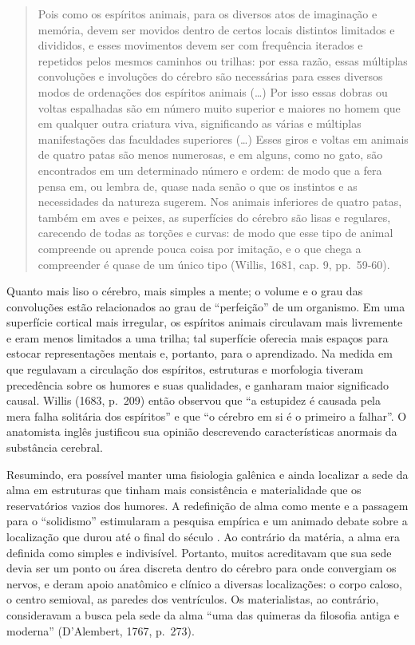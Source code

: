 \begin{quote}
Pois como os espíritos animais, para os diversos atos de imaginação e
memória, devem ser movidos dentro de certos locais distintos limitados e
divididos, e esses movimentos devem ser com frequência iterados e
repetidos pelos mesmos caminhos ou trilhas: por essa razão, essas
múltiplas convoluções e involuções do cérebro são necessárias para esses
diversos modos de ordenações dos espíritos animais (\ldots{}) Por isso essas
dobras ou voltas espalhadas são em número muito superior e maiores no
homem que em qualquer outra criatura viva, significando as várias e
múltiplas manifestações das faculdades superiores (\ldots{}) Esses giros e
voltas em animais de quatro patas são menos numerosas, e em alguns, como
no gato, são encontrados em um determinado número e ordem: de modo que a
fera pensa em, ou lembra de, quase nada senão o que os instintos e as
necessidades da natureza sugerem. Nos animais inferiores de quatro patas,
também em aves e peixes, as superfícies do cérebro são lisas
e regulares, carecendo de todas as torções e curvas: de modo que esse
tipo de animal compreende ou aprende pouca coisa por imitação, e o que
chega a compreender é quase de um único tipo (Willis, 1681, cap. 9,
pp.~59-60).
\end{quote}

Quanto mais liso o cérebro, mais simples a mente; o volume e o grau das
convoluções estão relacionados ao grau de ``perfeição'' de um organismo.
Em uma superfície cortical mais irregular, os espíritos animais
circulavam mais livremente e eram menos limitados a uma trilha; tal
superfície oferecia mais espaços para estocar representações mentais e,
portanto, para o aprendizado. Na medida em que regulavam a circulação
dos espíritos, estruturas e morfologia tiveram precedência sobre os
humores e suas qualidades, e ganharam maior significado causal. Willis
(1683, p.~209) então observou que ``a estupidez é causada pela mera
falha solitária dos espíritos'' e que ``o cérebro em si é o primeiro a
falhar''. O anatomista inglês justificou sua opinião descrevendo
características anormais da substância cerebral.

Resumindo, era possível manter uma fisiologia galênica e ainda localizar
a sede da alma em estruturas que tinham mais consistência e
materialidade que os reservatórios vazios dos humores. A redefinição de
alma como mente e a passagem para o ``solidismo'' estimularam a pesquisa
empírica e um animado debate sobre a localização que durou até o final
do século . Ao contrário da matéria, a alma era definida como
simples e indivisível. Portanto, muitos acreditavam que sua sede devia
ser um ponto ou área discreta dentro do cérebro para onde convergiam os
nervos, e deram apoio anatômico e clínico a diversas localizações: o
corpo caloso, o centro semioval, as paredes dos ventrículos. Os
materialistas, ao contrário, consideravam a busca pela sede da alma
``uma das quimeras da filosofia antiga e moderna'' (D'Alembert, 1767,
p.~273).

